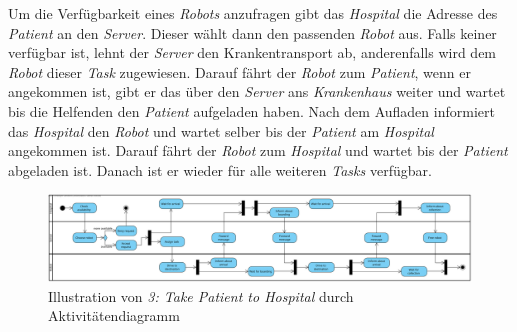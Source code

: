 			Um die Verfügbarkeit eines \emph{Robots} anzufragen gibt das \emph{Hospital} die Adresse des \emph{Patient} an den \emph{Server}. 
			Dieser wählt dann den passenden \emph{Robot} aus. 
			Falls keiner verfügbar ist, lehnt der \emph{Server} den Krankentransport ab, anderenfalls wird dem \emph{Robot} dieser \emph{Task} zugewiesen. 
			Darauf fährt der \emph{Robot} zum \emph{Patient}, wenn er angekommen ist, gibt er das über den \emph{Server} ans \emph{Krankenhaus} weiter und wartet bis die Helfenden den \emph{Patient} aufgeladen haben. 
			Nach dem Aufladen informiert das \emph{Hospital} den \emph{Robot} und wartet selber bis der \emph{Patient} am \emph{Hospital} angekommen ist. 
			Darauf fährt der \emph{Robot} zum \emph{Hospital} und wartet bis der \emph{Patient} abgeladen ist. 
			Danach ist er wieder für alle weiteren \emph{Tasks} verfügbar.
			
			\begin{figure}[H]
				\centering
				\includegraphics[width=1.4\textwidth, angle=90]{img/1-Analyse-2-Geschaeftsprozess_TakePatientToHospital}
				\caption{Illustration von \emph{3: Take Patient to Hospital} durch Aktivitätendiagramm}
				\label{fig:2-4-take-patient-to-hospital-aktivitaetendiagramm}
			\end{figure}
	\pagebreak

	

